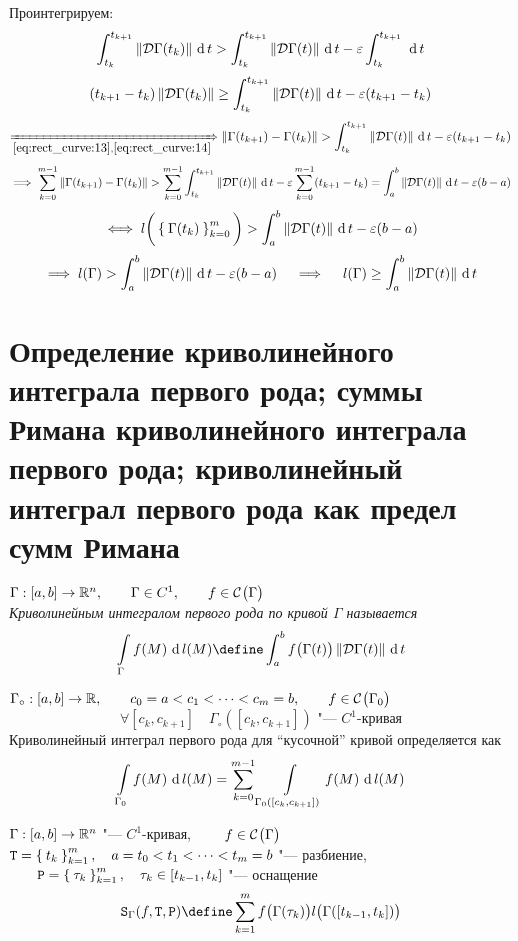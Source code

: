 \begin{iproof}
	Проинтегрируем:
	$$ \dint[t]{t_k}{t_{k + 1}}{\norm{\mc D\Gamma(t_k)}} > \dint[t]{t_k}{t_{k + 1}}{\norm{ \mc D\Gamma(t)}} - \veps \dint[t]{t_k}{t_{k + 1}}{} $$
	$$ (t_{k + 1} - t_k) \norm{\mc D\Gamma(t_k)} \ge \dint[t]{t_k}{t_{k + 1}}{\norm{\mc D\Gamma(t)}} - \veps(t_{k + 1} - t_k) $$
	$$ \underimp{\eref{rect_curve:13}, \eref{rect_curve:14}} \norm{\Gamma(t_{k + 1}) - \Gamma(t_k)} > \dint[t]{t_k}{t_{k + 1}}{\norm{\mc D\Gamma(t)}} - \veps(t_{k + 1} - t_k) $$
	$$ \implies \sum_{k = 0}^{m - 1} \norm{\Gamma(t_{k + 1}) - \Gamma(t_k)} > \sum_{k = 0}^{m - 1} \dint[t]{t_k}{t_{k + 1}}{\norm{\mc D\Gamma(t)}} - \veps \sum_{k = 0}^{m - 1}(t_{k + 1} - t_k) = \dint[t]ab{\norm{\mc D\Gamma(t)}} - \veps(b - a) $$
	$$ \iff l \bigg( \seqz[m]{\Gamma(t_k)}k \bigg) > \dint[t]ab{\norm{\mc D\Gamma(t)}} - \veps(b - a) $$
	$$ \implies l(\Gamma) > \dint[t]ab{\norm{\mc D \Gamma(t)}} - \veps(b - a) \quad \implies \quad l(\Gamma) \ge \dint[t]ab{\norm{\mc D \Gamma(t)}} $$
\end{iproof}

\section{Определение криволинейного интеграла первого рода; суммы Римана криволинейного интеграла первого рода; криволинейный интеграл первого рода как предел сумм Римана}

\begin{definition}
	$ \Gamma : [a, b] \to \R^n, \qquad \Gamma \in C^1, \qquad f \in \Cont\Gamma $ \\
	\it{Криволинейным интегралом первого рода} по кривой $ \Gamma $ называется
	$$ \cint[l(M)]\Gamma{f(M)} \define \dint[t]ab{f \big( \Gamma(t) \big)\norm{\mc D\Gamma(t)}} $$
\end{definition}

\begin{definition}
	$ \Gamma_\circ : [a, b] \to \R, \qquad c_0 = a < c_1 < \dots < c_m = b, \qquad f \in \Cont{\Gamma_0} $
	$$ \forall [c_k, c_{k + 1}] \quad \Gamma_\circ([c_k, c_{k + 1}]) \text{ "--- } C^1 \text{-кривая} $$
	Криволинейный интеграл первого рода для ``кусочной'' кривой определяется как
	$$ \cint[l(M)]{\Gamma_0}{f(M)} = \sum_{k = 0}^{m - 1} \cint[l(M)]{\Gamma_0([c_k, c_{k + 1}])}{f(M)} $$
\end{definition}

\begin{definition}
	$ \Gamma : [a, b] \to \R^n $ "--- $ C^1 $-кривая, $ \qquad f \in \Cont\Gamma $ \\
	$ \Teq = \seq[m]{t_k}k, \quad a = t_0 < t_1 < \dots < t_m = b $ "--- разбиение, $ \qquad \Par = \seq[m]{\tau_k}k, \quad \tau_k \in [t_{k - 1}, t_k] $ "--- оснащение
	$$ \Sr_\Gamma (f, \Teq, \Par) \define \sum_{k = 1}^m f \big( \Gamma(\tau_k) \big) l \big( \Gamma([t_{k - 1}, t_k]) \big) $$
\end{definition}

